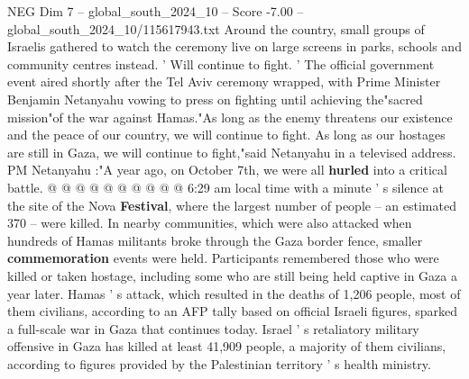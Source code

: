 \begin{textsample}{NEG Dim 7 – global\_south\_2024\_10 – Score -7.00 – global\_south\_2024\_10/115617943.txt}
Around the country, small groups of Israelis gathered to watch the ceremony live on large screens in parks, schools and community centres instead. ' Will continue to fight. ' The official government event aired shortly after the Tel Aviv ceremony wrapped, with Prime Minister Benjamin Netanyahu vowing to press on fighting until achieving the"sacred mission"of the war against Hamas."As long as the enemy threatens our existence and the peace of our country, we will continue to fight.
As long as our hostages are still in Gaza, we will continue to fight,"said Netanyahu in a televised address.
PM Netanyahu :"A year ago, on October 7th, we were all \textbf{hurled} into a critical battle. @ @ @ @ @ @ @ @ @ @ 6:29 am local time with a minute ' s silence at the site of the Nova \textbf{Festival}, where the largest number of people -- an estimated 370 -- were killed.
In nearby communities, which were also attacked when hundreds of Hamas militants broke through the Gaza border fence, smaller \textbf{commemoration} events were held.
Participants remembered those who were killed or taken hostage, including some who are still being held captive in Gaza a year later.
Hamas ' s attack, which resulted in the deaths of 1,206 people, most of them civilians, according to an AFP tally based on official Israeli figures, sparked a full-scale war in Gaza that continues today.
Israel ' s retaliatory military offensive in Gaza has killed at least 41,909 people, a majority of them civilians, according to figures provided by the Palestinian territory ' s health ministry.

\end{textsample}
